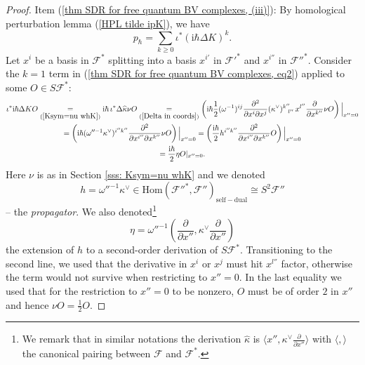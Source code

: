 \documentclass{amsart}
\theoremstyle{plain} %
\theoremstyle{definition}
\theoremstyle{remark}
\newcommand{\mr}{\mathrm}
\newcommand{\wh}{\widehat}
\newcommand{\F}{\mathcal{F}}
\newcommand{\dd}{\partial}
\newcommand{\iii}{\mathrm{i}}
\begin{document}
\begin{proof}
    Item (\ref{thm SDR for free quantum BV complexes, (iii)}): 
    By homological perturbation lemma (\ref{HPL tilde ipK}),
    we have
    \begin{equation}\label{thm SDR for free quantum BV complexes, eq2}
        p_\hbar=\sum_{k\geq 0} \iota^* (\iii\hbar \Delta K)^k.
    \end{equation}
    Let $x^i$ be a basis in $\F^*$ splitting into a basis $x^{i'}$ in $\F'^*$ and $x^{i''}$ in $\F''^*$. 
    Consider the $k=1$ term in (\ref{thm SDR for free quantum BV complexes, eq2}) applied to some $O\in S\F^*$:
    \begin{multline}\label{thm SDR for free quantum BV complexes, eq3}
        \iota^* \iii\hbar\Delta K O \underset{(\ref{Ksym=nu whK})}{=}
        \iii\hbar\, \iota^* \Delta \wh\kappa \nu O
        \underset{(\ref{Delta in coords})}{=} \left(\iii\hbar \frac12(\omega^{-1})^{ij}\frac{\dd^2}{\dd x^i\dd x^j} (\kappa^\vee)^{k''}_{\;\;\;l''}\, x^{l''} \frac{\dd}{\dd x^{k''}} \nu O\right) \Big|_{x''=0}\\=
        \left(\iii\hbar (\omega''^{-1}\kappa^\vee)^{i''k''}\frac{\dd^2}{\dd x^{i''}\dd x^{k''}} \nu O\right)\Big|_{x''=0}
        = \left(\frac{\iii\hbar}{2} h^{i''k''}\frac{\dd^2}{\dd x^{i''}\dd x^{k''}} O\right)\Big|_{x''=0}\\=\frac{\iii\hbar}{2} \eta O|_{x''=0}.
    \end{multline}
    Here $\nu$ is as in Section \ref{sss: Ksym=nu whK} and we denoted 
    \begin{equation}\label{h}
    h=\omega''^{-1}\kappa^\vee \in \mr{Hom}(\F''^*,\F'')_\mr{self-dual}\cong S^2 \F''
    \end{equation}
    -- the \emph{propagator}. We also denoted\footnote{
    We remark that in similar notations the derivation $\wh\kappa$ is $\langle x'',\kappa^\vee \frac{\dd}{\dd x''} \rangle$ with $\langle,\rangle$ the canonical pairing between $\F$ and $\F^*$.
    } 
    \begin{equation}\label{H second order derivation}
    \eta= \omega''^{-1}\left(\frac{\dd}{\dd x''},\kappa^\vee \frac{\dd}{\dd x''}\right)
    \end{equation} 
    the extension of $h$ to a second-order derivation of $S\F^*$. Transitioning to the second line, we used that the derivative in $x^i$ or $x^j$ must hit $x^{l''}$ factor, otherwise the term would not survive when restricting to $x''=0$. In the last equality we used that for the restriction to $x''=0$ to be nonzero, $O$ must be of order $2$ in $x''$ and hence $\nu O=\frac12 O$.
    

\end{proof}
\end{document}
